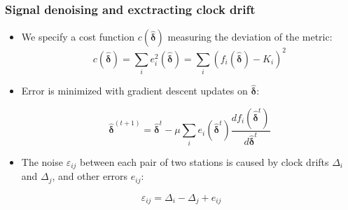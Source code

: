 \documentclass{beamer}
\begin{document}
\begin{frame}
\frametitle{Signal denoising and exctracting clock drift}
\begin{itemize}
\item We specify a cost function $c(\bm{\hat{\delta}})$ measuring the deviation of the metric:
\begin{equation}
c(\bm{\hat{\delta}}) = \sum_i e_i^2(\bm{\hat{\delta}}) = \sum_i(f_i(\bm{\hat{\delta}})-K_i)^2
\end{equation}

\item Error is minimized with gradient descent updates on $\bm{\hat{\delta}}$: 

\begin{equation}
\bm{\hat{\delta}}^{(t+1)} = \bm{\hat{\delta}}^t-\mu\sum_i e_i(\bm{\hat{\delta}}^t)\frac{df_i(\bm{\hat{\delta}}^t)}{d\bm{\hat{\delta}}^t}
\label{eq:updates}
\end{equation}

\item The noise $\varepsilon_{ij}$ between each pair of two stations is caused by clock drifts $\Delta_i$ and $\Delta_j$, and other errors $e_{ij}$:
\end{itemize}
\begin{equation}
\varepsilon_{ij} = \Delta_i - \Delta_j + e_{ij}
\end{equation}

\end{frame}
\end{document}
